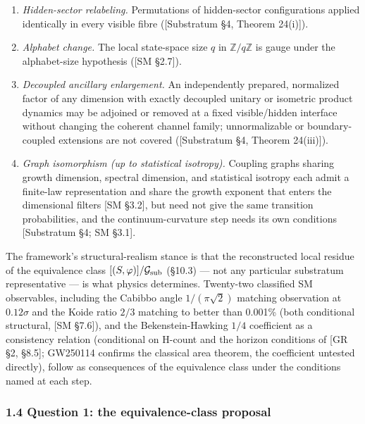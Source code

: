 \documentclass[
]{article}
\providecommand{\tightlist}{%
  \setlength{\itemsep}{0pt}\setlength{\parskip}{0pt}}
\begin{document}
\begin{enumerate}
\def\labelenumi{(\roman{enumi})}
\tightlist
\item
  \emph{Hidden-sector relabeling.} Permutations of hidden-sector
  configurations applied identically in every visible fibre
  ({[}Substratum §4, Theorem 24(i){]}).
\item
  \emph{Alphabet change.} The local state-space size \(q\) in
  \(\mathbb{Z}/q\mathbb{Z}\) is gauge under the alphabet-size hypothesis
  ({[}SM §2.7{]}).
\item
  \emph{Decoupled ancillary enlargement.} An independently prepared,
  normalized factor of any dimension with exactly decoupled unitary or
  isometric product dynamics may be adjoined or removed at a fixed
  visible/hidden interface without changing the coherent channel family;
  unnormalizable or boundary-coupled extensions are not covered
  ({[}Substratum §4, Theorem 24(iii){]}).
\item
  \emph{Graph isomorphism (up to statistical isotropy).} Coupling graphs
  sharing growth dimension, spectral dimension, and statistical isotropy
  each admit a finite-law representation and share the growth exponent
  that enters the dimensional filters {[}SM §3.2{]}, but need not give
  the same transition probabilities, and the continuum-curvature step
  needs its own conditions {[}Substratum §4; SM §3.1{]}.
\end{enumerate}

The framework's structural-realism stance is that the reconstructed
local residue of the equivalence class
\([(S, \varphi)]/\mathcal{G}_{\rm sub}\) (§10.3) --- not any particular
substratum representative --- is what physics determines. Twenty-two
classified SM observables, including the Cabibbo angle
\(1/(\pi\sqrt{2})\) matching observation at \(0.12\sigma\) and the Koide
ratio \(2/3\) matching to better than 0.001\% (both conditional
structural, {[}SM §7.6{]}), and the Bekenstein-Hawking \(1/4\)
coefficient as a consistency relation (conditional on H-count and the
horizon conditions of {[}GR §2, §8.5{]}; GW250114 confirms the classical
area theorem, the coefficient untested directly), follow as consequences
of the equivalence class under the conditions named at each step.

\hypertarget{question-1-the-equivalence-class-proposal}{%
\subsubsection{1.4 Question 1: the equivalence-class
proposal}\label{question-1-the-equivalence-class-proposal}}
\end{document}
